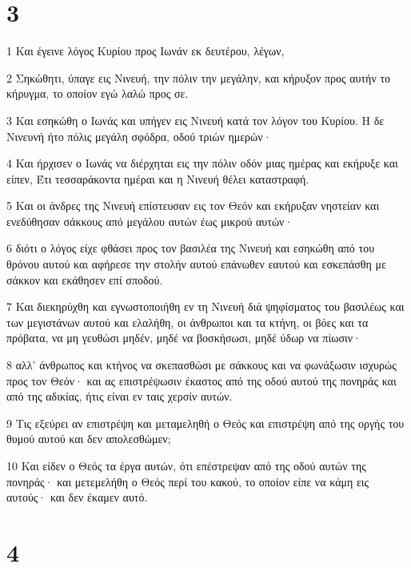 \chapter{3}

\par 1 Και έγεινε λόγος Κυρίου προς Ιωνάν εκ δευτέρου, λέγων,
\par 2 Σηκώθητι, ύπαγε εις Νινευή, την πόλιν την μεγάλην, και κήρυξον προς αυτήν το κήρυγμα, το οποίον εγώ λαλώ προς σε.
\par 3 Και εσηκώθη ο Ιωνάς και υπήγεν εις Νινευή κατά τον λόγον του Κυρίου. Η δε Νινευνή ήτο πόλις μεγάλη σφόδρα, οδού τριών ημερών·
\par 4 Και ήρχισεν ο Ιωνάς να διέρχηται εις την πόλιν οδόν μιας ημέρας και εκήρυξε και είπεν, Έτι τεσσαράκοντα ημέραι και η Νινευή θέλει καταστραφή.
\par 5 Και οι άνδρες της Νινευή επίστευσαν εις τον Θεόν και εκήρυξαν νηστείαν και ενεδύθησαν σάκκους από μεγάλου αυτών έως μικρού αυτών·
\par 6 διότι ο λόγος είχε φθάσει προς τον βασιλέα της Νινευή και εσηκώθη από του θρόνου αυτού και αφήρεσε την στολήν αυτού επάνωθεν εαυτού και εσκεπάσθη με σάκκον και εκάθησεν επί σποδού.
\par 7 Και διεκηρύχθη και εγνωστοποιήθη εν τη Νινευή διά ψηφίσματος του βασιλέως και των μεγιστάνων αυτού και ελαλήθη, οι άνθρωποι και τα κτήνη, οι βόες και τα πρόβατα, να μη γευθώσι μηδέν, μηδέ να βοσκήσωσι, μηδέ ύδωρ να πίωσιν·
\par 8 αλλ' άνθρωπος και κτήνος να σκεπασθώσι με σάκκους και να φωνάξωσιν ισχυρώς προς τον Θεόν· και ας επιστρέψωσιν έκαστος από της οδού αυτού της πονηράς και από της αδικίας, ήτις είναι εν ταις χερσίν αυτών.
\par 9 Τις εξεύρει αν επιστρέψη και μεταμεληθή ο Θεός και επιστρέψη από της οργής του θυμού αυτού και δεν απολεσθώμεν;
\par 10 Και είδεν ο Θεός τα έργα αυτών, ότι επέστρεψαν από της οδού αυτών της πονηράς· και μετεμελήθη ο Θεός περί του κακού, το οποίον είπε να κάμη εις αυτούς· και δεν έκαμεν αυτό.

\chapter{4}

